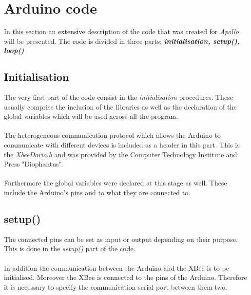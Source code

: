 \documentclass[12pt,a4paper,draft]{report}
\begin{document}
\section{Arduino code}
In this section an extensive description of the code that was created for \emph{Apollo} will be presented.
The code is divided in three parts; \textit{\textbf{initialisation, setup(), loop()}}
%
\subsection{Initialisation}
The very first part of the code consist in the \textit{initialisation} procedures.
These usually comprise the inclusion of the libraries as well as the declaration of the global variables which will be used across all the program.\\
\ \\
The heterogeneous communication protocol which allows the Arduino to communicate with different devices is included as a header in this part. This is the \textit{XbeeDario.h} and was provided by the Computer Technology Institute and Press "Diophantus".\\
\ \\
Furthermore the global variables were declared at this stage as well.
These include the Arduino's pins and to what they are connected to. 
%
\subsection{setup()}
The connected pins can be set as input or output depending on their purpose.
This is done in the \textit{setup()} part of the code.\\
\ \\
In addition the communication between the Arduino and the XBee is to be initialised.
Moreover the XBee is connected to the pins of the Arduino.
Therefore it is necessary to specify the communication serial port between them two.
%
\end{document}
